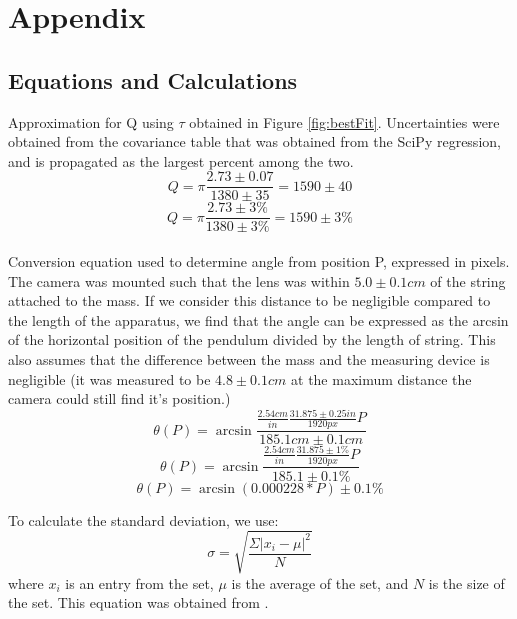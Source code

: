 \documentclass[11pt]{article}
\begin{document}
    \section{Appendix}
        \subsection{Equations and Calculations}\label{app:Calc}
            Approximation for Q using $\tau$ obtained in Figure \ref{fig:bestFit}. Uncertainties were obtained from the covariance table that was obtained from the SciPy regression, and is propagated as the largest percent among the two.
            \begin{equation}
                Q = \pi\frac{2.73 \pm 0.07}{1380 \pm 35} = 1590 \pm 40
                \label{calc:tauApprox}
            \end{equation}
            \begin{equation}
                Q = \pi\frac{2.73 \pm 3\%}{1380 \pm 3\%} = 1590 \pm 3\% 
                \label{calc:tauApprox}
            \end{equation}
            \\
            Conversion equation used to determine angle from position P, expressed in pixels. The camera was mounted such that the lens was within $5.0 \pm 0.1cm$ of the string attached to the mass. If we consider this distance to be negligible compared to the length of the apparatus, we find that the angle can be expressed as the arcsin of the horizontal position of the pendulum divided by the length of string. This also assumes that the difference between the mass and the measuring device is negligible (it was measured to be $4.8 \pm 0.1cm$ at the maximum distance the camera could still find it's position.)
            \begin{equation}
                \theta(P) = \arcsin{\frac{\frac{2.54cm}{in}\frac{31.875 \pm 0.25in}{1920px} P}{185.1cm \pm 0.1cm}} 
                \label{calc:thetaApprox}
            \end{equation}
            \begin{equation}
                \theta(P) = \arcsin{\frac{\frac{2.54cm}{in}\frac{31.875 \pm 1\%}{1920px} P}{185.1 \pm 0.1\%}} 
            \end{equation}
            \begin{equation}
                \theta(P) = \arcsin{(0.000228 * P)} \pm 0.1\% 
            \end{equation}
        
        To calculate the standard deviation, we use:
        \begin{equation}
            \sigma = \sqrt{\frac{\Sigma|x_i - \mu|^{2}}{N}}
            \label{eq:stdev}
        \end{equation}
        where $x_i$ is an entry from the set, $\mu$ is the average of the set, and $N$ is the size of the set. This equation was obtained from \cite{khan_2020}.
\end{document}
